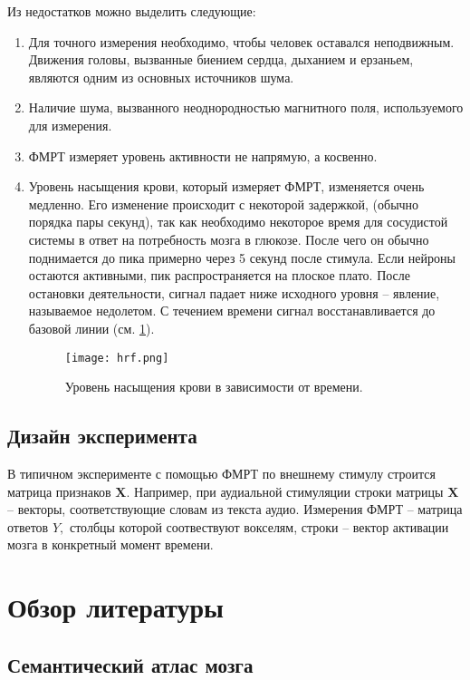 \documentclass[pdftex,ptm,12pt,a4paper]{report}
\theoremstyle{definition}
\begin{document}
Из недостатков можно выделить следующие:

\begin{enumerate}
\item Для точного измерения необходимо, чтобы человек оставался неподвижным. Движения головы, вызванные биением сердца, дыханием и  ерзаньем, являются одним из основных источников шума.

\item Наличие шума, вызванного неоднородностью магнитного поля, используемого для измерения.

\item ФМРТ измеряет уровень активности не напрямую, а косвенно.

\item Уровень насыщения крови, который измеряет ФМРТ, изменяется очень медленно. Его изменение происходит с некоторой задержкой, (обычно порядка пары секунд), так как необходимо некоторое время для сосудистой системы в ответ на потребность мозга в глюкозе. После чего он обычно поднимается до пика примерно через 5 секунд после стимула. Если нейроны остаются активными, пик распространяется на плоское плато. После остановки деятельности, сигнал падает ниже исходного уровня -- явление, называемое недолетом. С течением времени сигнал восстанавливается до базовой линии (см. \ref{hrf}). 

\begin{figure}[h]
\texttt{[image: hrf.png]}
\centering
\caption{Уровень насыщения крови в зависимости от времени.}
\label{hrf}
\end{figure}

\end{enumerate}

\section{Дизайн эксперимента}

В типичном эксперименте с помощью ФМРТ по внешнему стимулу строится матрица признаков $\textbf{X}.$ Например, при аудиальной стимуляции строки матрицы $\textbf{X}$ -- векторы, соответствующие словам из текста аудио. Измерения ФМРТ -- матрица ответов $Y,$ столбцы которой соотвествуют вокселям, строки -- вектор активации мозга в конкретный момент времени.


\chapter{Обзор литературы}
\section{Семантический атлас мозга}\label{complex}
\end{document}
